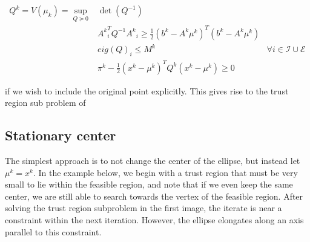 \documentclass{article}
\begin{document}
\begin{center}
\begin{align}
\label{ellipse_1}
Q^k = V(\mu_k) = \sup_{Q \succeq 0} & \det(Q^{-1}) & \\
  & {A^k}_i^T Q^{-1} {A^k}_i \ge \frac 1 2 (b^k - A^k\mu^{k})^T(b^k - A^k \mu^{k}) & \\
  & eig(Q)_i \le M^k & \forall i \in \mathcal I \cup \mathcal E \\
  & \pi^k - \frac 1 2 (x^k - \mu^{k})^TQ^{k}(x^k - \mu^{k}) \ge 0
\end{align}
\end{center}

if we wish to include the original point explicitly.
This gives rise to the trust region sub problem of











\subsection{Stationary center}
The simplest approach is to not change the center of the ellipse, but instead let $\mu^k = x^k$.
In the example below, we begin with a trust region that must be very small to lie within the feasible region, and note that if we even keep the same center, we are still able to search towards the vertex of the feasible region.
After solving the trust region subproblem in the first image, the iterate is near a constraint within the next iteration.
However, the ellipse elongates along an axis parallel to this constraint.
\end{document}
